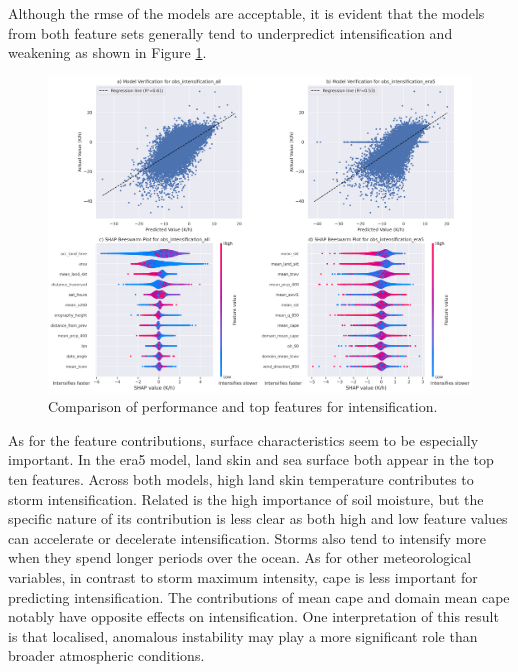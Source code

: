 Although the \acrshort{rmse} of the models are acceptable, it is evident that the models from both feature sets generally tend to underpredict intensification and weakening as shown in Figure \ref{fig:obs_intensification_summary}.

\begin{figure}[ht]
    \centering
    \includegraphics[width=\textwidth]{../figures/generated/experiments/obs_intensification/obs_intensification_summary.png}
    \caption{Comparison of performance and top features for intensification.}
    \label{fig:obs_intensification_summary}
\end{figure}

As for the feature contributions, surface characteristics seem to be especially important. In the \acrshort{era5} model, land skin and sea surface both appear in the top ten features. Across both models, high land skin temperature contributes to storm intensification. Related is the high importance of soil moisture, but the specific nature of its contribution is less clear as both high and low feature values can accelerate or decelerate intensification. Storms also tend to intensify more when they spend longer periods over the ocean. As for other meteorological variables, in contrast to storm maximum intensity, \acrshort{cape} is less important for predicting intensification. The contributions of mean \acrshort{cape} and domain mean \acrshort{cape} notably have opposite effects on intensification. One interpretation of this result is that localised, anomalous instability may play a more significant role than broader atmospheric conditions.

